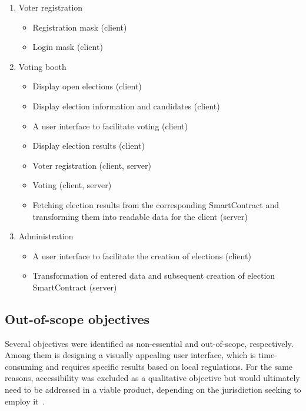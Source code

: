 \begin{enumerate}
    \item Voter registration
    \begin{itemize}
        \item Registration mask (client)
        \item Login mask (client)
    \end{itemize}
    \item Voting booth
    \begin{itemize}
        \item Display open elections (client)
        \item Display election information and candidates (client)
        \item A user interface to facilitate voting (client)
        \item Display election results (client)
        \item Voter registration (client, server)
        \item Voting (client, server)
        \item Fetching election results from the corresponding \gls{SmartContract} and transforming them into readable data for the client (server)
    \end{itemize}
    \item Administration
    \begin{itemize}
        \item A user interface to facilitate the creation of elections (client)
        \item Transformation of entered data and subsequent creation of election \gls{SmartContract} (server)
    \end{itemize}
\end{enumerate}

\subsection{Out-of-scope objectives}\label{subsec:out-of-scope-objectives}

Several objectives were identified as non-essential and out-of-scope, respectively.
Among them is designing a visually appealing user interface, which is time-consuming and requires specific results based on local regulations.
For the same reasons, accessibility was excluded as a qualitative objective but would ultimately need to be addressed in a viable product, depending on the jurisdiction seeking to employ it~\autocites{laskowski_promoting_2022}[sections 2.2, 2.7]{lowry_desirable_2009}.

